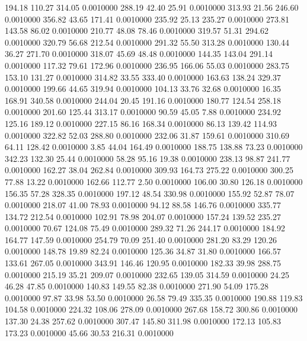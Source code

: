  194.18  110.27  314.05   0.0010000
 288.19   42.40   25.91   0.0010000
 313.93   21.56  246.60   0.0010000
 356.82   43.65  171.41   0.0010000
 235.92   25.13  235.27   0.0010000
 273.81  143.58   86.02   0.0010000
 210.77   48.08   78.46   0.0010000
 319.57   51.31  294.62   0.0010000
 320.79   56.68  212.54   0.0010000
 291.32   55.50  313.28   0.0010000
 130.44   36.27  271.70   0.0010000
 318.07   45.69   48.48   0.0010000
 144.35  143.04  291.14   0.0010000
 117.32   79.61  172.96   0.0010000
 236.95  166.06   55.03   0.0010000
 283.75  153.10  131.27   0.0010000
 314.82   33.55  333.40   0.0010000
 163.63  138.24  329.37   0.0010000
 199.66   44.65  319.94   0.0010000
 104.13   33.76   32.68   0.0010000
  16.35  168.91  340.58   0.0010000
 244.04   20.45  191.16   0.0010000
 180.77  124.54  258.18   0.0010000
 201.60  125.44  313.17   0.0010000
  90.59   45.05    7.88   0.0010000
 234.92  125.16  189.12   0.0010000
 227.15   86.16  168.34   0.0010000
  86.13  139.42  114.93   0.0010000
 322.82   52.03  288.80   0.0010000
 232.06   31.87  159.61   0.0010000
 310.69   64.11  128.42   0.0010000
   3.85   44.04  164.49   0.0010000
 188.75  138.88   73.23   0.0010000
 342.23  132.30   25.44   0.0010000
  58.28   95.16   19.38   0.0010000
 238.13   98.87  241.77   0.0010000
 162.27   38.04  262.84   0.0010000
 309.93  164.73  275.22   0.0010000
 300.25   77.88   13.22   0.0010000
 162.66  112.77    2.50   0.0010000
 106.00   30.80  126.18   0.0010000
 156.35   57.28  328.35   0.0010000
 197.12   48.54  330.98   0.0010000
 155.92   52.87   78.07   0.0010000
 218.07   41.00   78.93   0.0010000
  94.12   88.58  146.76   0.0010000
 335.77  134.72  212.54   0.0010000
 102.91   78.98  204.07   0.0010000
 157.24  139.52  235.27   0.0010000
  70.67  124.08   75.49   0.0010000
 289.32   71.26  244.17   0.0010000
 184.92  164.77  147.59   0.0010000
 254.79   70.09  251.40   0.0010000
 281.20   83.29  120.26   0.0010000
 148.78   19.89   82.24   0.0010000
 125.36   34.87   31.80   0.0010000
 166.57  133.61  267.05   0.0010000
 343.91  146.46  120.95   0.0010000
 182.33   39.98  288.75   0.0010000
 215.19   35.21  209.07   0.0010000
 232.65  139.05  314.59   0.0010000
  24.25   46.28   47.85   0.0010000
 140.83  149.55   82.38   0.0010000
 271.90   54.09  175.28   0.0010000
  97.87   33.98   53.50   0.0010000
  26.58   79.49  335.35   0.0010000
 190.88  119.83  104.58   0.0010000
 224.32  108.06  278.09   0.0010000
 267.68  158.72  300.86   0.0010000
 137.30   24.38  257.62   0.0010000
 307.47  145.80  311.98   0.0010000
 172.13  105.83  173.23   0.0010000
  45.66   30.53  216.31   0.0010000
